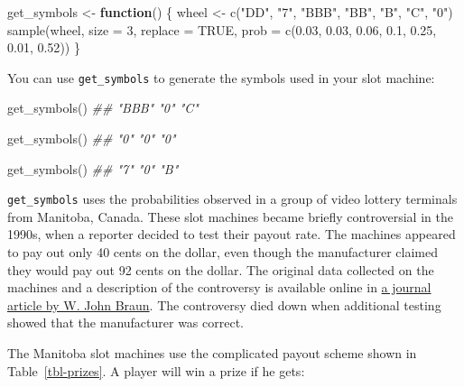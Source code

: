 \documentclass[
  letterpaper,
  DIV=11,
  numbers=noendperiod]{scrbook}
\newenvironment{Shaded}{\begin{snugshade}}{\end{snugshade}}
\newcommand{\AttributeTok}[1]{\textcolor[rgb]{0.40,0.45,0.13}{#1}}
\newcommand{\ConstantTok}[1]{\textcolor[rgb]{0.56,0.35,0.01}{#1}}
\newcommand{\ControlFlowTok}[1]{\textcolor[rgb]{0.00,0.23,0.31}{\textbf{#1}}}
\newcommand{\DecValTok}[1]{\textcolor[rgb]{0.68,0.00,0.00}{#1}}
\newcommand{\DocumentationTok}[1]{\textcolor[rgb]{0.37,0.37,0.37}{\textit{#1}}}
\newcommand{\FloatTok}[1]{\textcolor[rgb]{0.68,0.00,0.00}{#1}}
\newcommand{\FunctionTok}[1]{\textcolor[rgb]{0.28,0.35,0.67}{#1}}
\newcommand{\NormalTok}[1]{\textcolor[rgb]{0.00,0.23,0.31}{#1}}
\newcommand{\OtherTok}[1]{\textcolor[rgb]{0.00,0.23,0.31}{#1}}
\newcommand{\StringTok}[1]{\textcolor[rgb]{0.13,0.47,0.30}{#1}}
\begin{document}
\begin{Shaded}
\begin{Highlighting}[]
\NormalTok{get\_symbols }\OtherTok{\textless{}{-}} \ControlFlowTok{function}\NormalTok{() \{}
\NormalTok{  wheel }\OtherTok{\textless{}{-}} \FunctionTok{c}\NormalTok{(}\StringTok{"DD"}\NormalTok{, }\StringTok{"7"}\NormalTok{, }\StringTok{"BBB"}\NormalTok{, }\StringTok{"BB"}\NormalTok{, }\StringTok{"B"}\NormalTok{, }\StringTok{"C"}\NormalTok{, }\StringTok{"0"}\NormalTok{)}
  \FunctionTok{sample}\NormalTok{(wheel, }\AttributeTok{size =} \DecValTok{3}\NormalTok{, }\AttributeTok{replace =} \ConstantTok{TRUE}\NormalTok{, }
    \AttributeTok{prob =} \FunctionTok{c}\NormalTok{(}\FloatTok{0.03}\NormalTok{, }\FloatTok{0.03}\NormalTok{, }\FloatTok{0.06}\NormalTok{, }\FloatTok{0.1}\NormalTok{, }\FloatTok{0.25}\NormalTok{, }\FloatTok{0.01}\NormalTok{, }\FloatTok{0.52}\NormalTok{))}
\NormalTok{\}}
\end{Highlighting}
\end{Shaded}

You can use \texttt{get\_symbols} to generate the symbols used in your
slot machine:

\begin{Shaded}
\begin{Highlighting}[]
\FunctionTok{get\_symbols}\NormalTok{()}
\DocumentationTok{\#\# "BBB" "0"   "C"  }

\FunctionTok{get\_symbols}\NormalTok{()}
\DocumentationTok{\#\# "0" "0" "0"}

\FunctionTok{get\_symbols}\NormalTok{()}
\DocumentationTok{\#\# "7" "0" "B"}
\end{Highlighting}
\end{Shaded}

\texttt{get\_symbols} uses the probabilities observed in a group of
video lottery terminals from Manitoba, Canada. These slot machines
became briefly controversial in the 1990s, when a reporter decided to
test their payout rate. The machines appeared to pay out only 40 cents
on the dollar, even though the manufacturer claimed they would pay out
92 cents on the dollar. The original data collected on the machines and
a description of the controversy is available online in
\href{http://bit.ly/jse_Braun}{a journal article by W. John Braun}. The
controversy died down when additional testing showed that the
manufacturer was correct.

The Manitoba slot machines use the complicated payout scheme shown in
Table~\ref{tbl-prizes}. A player will win a prize if he gets:
\end{document}
